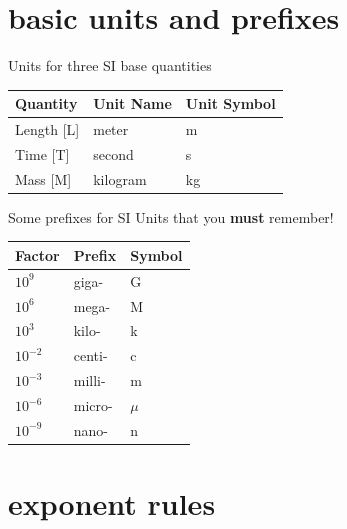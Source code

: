 \documentclass[
  letterpaper,
  DIV=11,
  numbers=noendperiod]{scrreprt}
\begin{document}
\section*{basic units and prefixes}\label{basic-units-and-prefixes}


Units for three SI base quantities

\begin{longtable}[]{@{}lll@{}}
\toprule\noalign{}
Quantity & Unit Name & Unit Symbol \\
\midrule\noalign{}
\endhead
\bottomrule\noalign{}
\endlastfoot
Length {[}L{]} & meter & m \\
Time {[}T{]} & second & s \\
Mass {[}M{]} & kilogram & kg \\
\end{longtable}

Some prefixes for SI Units that you \textbf{must} remember!

\begin{longtable}[]{@{}lll@{}}
\toprule\noalign{}
Factor & Prefix & Symbol \\
\midrule\noalign{}
\endhead
\bottomrule\noalign{}
\endlastfoot
\(10^9\) & giga- & G \\
\(10^6\) & mega- & M \\
\(10^3\) & kilo- & k \\
\(10^{-2}\) & centi- & c \\
\(10^{-3}\) & milli- & m \\
\(10^{-6}\) & micro- & \(\mu\) \\
\(10^{-9}\) & nano- & n \\
\end{longtable}

\section*{exponent rules}\label{exponent-rules}

\end{document}

